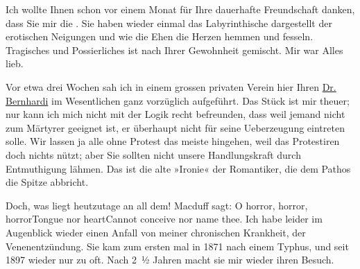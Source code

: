 \pstart
           Ich wollte Ihnen schon vor einem Monat für Ihre dauerhafte Freundschaft danken, dass
               Sie mir die \label{K_L02221-1v}\label{K_L02221-1}. Sie haben wieder einmal das Labyrinthische dargestellt der erotischen
               Neigungen und wie die Ehen die Herzen hemmen und fesseln. Tragisches und
               Possierliches ist nach Ihrer Gewohnheit gemischt. Mir war Alles lieb.\pend
           
\pstart
           Vor etwa drei Wochen sah ich in {\pb}einem grossen privaten Verein hier Ihren \uline{Dr. Bernhardi} im Wesentlichen ganz vorzüglich aufgeführt. Das Stück ist mir theuer; nur kann
               ich mich nicht mit der Logik recht befreunden, dass weil jemand nicht zum Märtyrer
               geeignet ist, er überhaupt nicht für seine Ueberzeugung eintreten solle. Wir lassen
               ja alle ohne Protest das meiste hingehen, weil das Protestiren doch nichts nützt;
               aber Sie sollten nicht unsere Handlungskraft durch Entmuthigung lähmen. Das ist die
               alte »Ironie« der Romantiker, die dem Pathos die Spitze abbricht.\pend
           
\pstart
           Doch, was liegt heutzutage an all dem! Macduff sagt:\pend
           \stanza{}O horror, horror, horror\newverse{}Tongue nor heart\newverse{}Cannot conceive nor name
                     thee.\stanzaend{}
\pstart
           {\pb}Ich habe leider im Augenblick
               wieder einen Anfall von meiner chronischen Krankheit, der Venenentzündung. Sie kam
               zum ersten mal in 1871 nach einem Typhus, und seit 1897
               wieder nur zu oft. Nach 2 ½ Jahren macht sie mir wieder ihren Besuch.\pend
           
